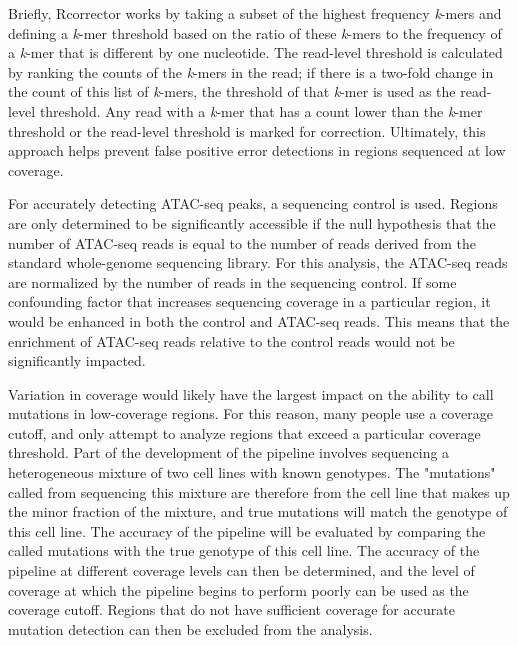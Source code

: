 Briefly, Rcorrector works by taking a subset of the highest frequency \textit{k}-mers and defining a \textit{k}-mer threshold based on the ratio of these \textit{k}-mers to the frequency of a \textit{k}-mer that is different by one nucleotide. The read-level threshold is calculated by ranking the counts of the \textit{k}-mers in the read; if there is a two-fold change in the count of this list of \textit{k}-mers, the threshold of that \textit{k}-mer is used as the read-level threshold. Any read with a \textit{k}-mer that has a count lower than the \textit{k}-mer threshold or the read-level threshold is marked for correction. Ultimately, this approach helps prevent false positive error detections in regions sequenced at low coverage.

For accurately detecting ATAC-seq peaks, a sequencing control is used.
Regions are only determined to be significantly accessible if the null hypothesis that the number of ATAC-seq reads is equal to the number of reads derived from the standard whole-genome sequencing library.
For this analysis, the ATAC-seq reads are normalized by the number of reads in the sequencing control.
If some confounding factor that increases sequencing coverage in a particular region, it would be enhanced in both the control and ATAC-seq reads. This means that the enrichment of ATAC-seq reads relative to the control reads would not be significantly impacted.

Variation in coverage would likely have the largest impact on the ability to call mutations in low-coverage regions. For this reason, many people use a coverage cutoff, and only attempt to analyze regions that exceed a particular coverage threshold. Part of the development of the pipeline involves sequencing a heterogeneous mixture of two cell lines with known genotypes. The "mutations" called from sequencing this mixture are therefore from the cell line that makes up the minor fraction of the mixture, and true mutations will match the genotype of this cell line. The accuracy of the pipeline will be evaluated by comparing the called mutations with the true genotype of this cell line. The accuracy of the pipeline at different coverage levels can then be determined, and the level of coverage at which the pipeline begins to perform poorly can be used as the coverage cutoff. Regions that do not have sufficient coverage for accurate mutation detection can then be excluded from the analysis.


